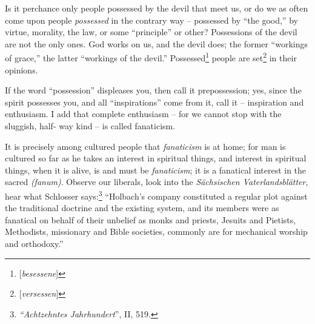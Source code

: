 Is it perchance only people possessed by the devil that meet us, or do we as 
often come upon people \textit{possessed} in the contrary way -- possessed by 
``the good,'' by virtue, morality, the law, or some ``principle'' or 
other? Possessions of the devil are not the only ones. God works on us, and 
the devil does; the former ``workings of grace,'' the latter ``workings of 
the devil.'' Possessed\footnote{[\textit{besessene}]} people are 
set\footnote{[\textit{versessen}]} in their opinions.

If the word ``possession'' displeases you, then call it prepossession; yes, 
since the spirit possesses you, and all ``inspirations'' come from it, call 
it -- inspiration and enthusiasm. I add that complete enthusiasm -- for we 
cannot stop with the sluggish, half- way kind -- is called fanaticism.

It is precisely among cultured people that \textit{fanaticism} is at home; for 
man is cultured so far as he takes an interest in spiritual things, and 
interest in spiritual things, when it is alive, is and must be 
\textit{fanaticism}; it is a fanatical interest in the sacred 
\textit{(fanum)}. Observe our liberals, look into the \textit{S\"achsischen 
Vaterlandsbl\"atter}, hear what Schlosser 
says:\footnote{\textit{``Achtzehntes Jahrhundert}'', II, 519.} ``Holbach's 
company constituted a regular plot against the traditional doctrine and the 
existing system, and its members were as fanatical on behalf of their unbelief 
as monks and priests, Jesuits and Pietists, Methodists, missionary and Bible 
societies, commonly are for mechanical worship and orthodoxy.''

